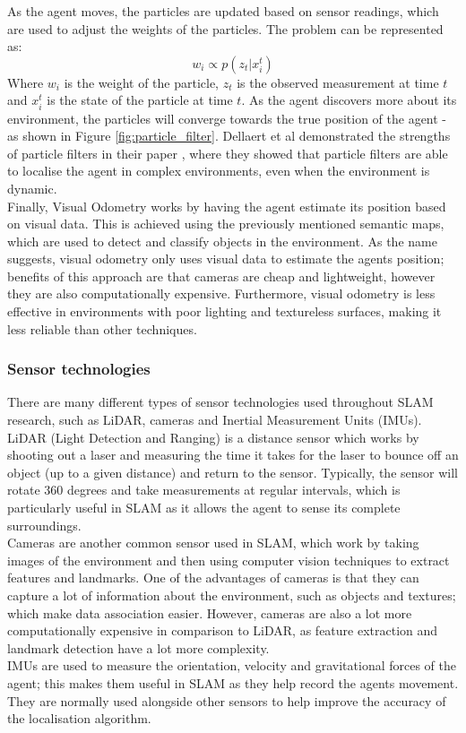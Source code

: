 \documentclass[12pt]{article}
\begin{document}
As the agent moves, the particles are updated based on sensor readings, which are used to adjust the weights of the particles. The problem can be represented as:
\begin{equation}
    w_i \propto p(z_t | x_i^t)
\end{equation}
Where \(w_i\) is the weight of the particle, \(z_t\) is the observed measurement at time \(t\) and \(x_i^t\) is the state of the particle at time \(t\). As the agent discovers more about its
environment, the particles will converge towards the true position of the agent - as shown in Figure \ref{fig:particle_filter}. Dellaert et al demonstrated the strengths of particle filters in their paper
\cite{monte_carlo_slam}, where they showed that particle filters are able to localise the agent in complex environments, even when the environment is dynamic.\\

Finally, Visual Odometry works by having the agent estimate its position based on visual data. This is achieved using the previously mentioned semantic maps, which are used to detect and classify
objects in the environment. As the name suggests, visual odometry only uses visual data to estimate the agents position; benefits of this approach are that cameras are cheap and lightweight, however
they are also computationally expensive. Furthermore, visual odometry is less effective in environments with poor lighting and textureless surfaces, making it less reliable than other techniques. \\

\subsubsection{Sensor technologies}
There are many different types of sensor technologies used throughout SLAM research, such as LiDAR, cameras and Inertial Measurement
Units (IMUs). LiDAR (Light Detection and Ranging) is a distance sensor which works by shooting out a laser and measuring the time it takes
for the laser to bounce off an object (up to a given distance) and return to the sensor. Typically, the sensor will rotate 360 degrees and take
measurements at regular intervals, which is particularly useful in SLAM as it allows the agent to sense its complete surroundings.\\
Cameras are another common sensor used in SLAM, which work by taking images of the environment and then using computer vision techniques
to extract features and landmarks. One of the advantages of cameras is that they can capture a lot of information about the environment, such
as objects and textures; which make data association easier. However, cameras are also a lot more computationally expensive in comparison to
LiDAR, as feature extraction and landmark detection have a lot more complexity.\\
IMUs are used to measure the orientation, velocity and gravitational forces of the agent; this makes them useful in SLAM as they help record
the agents movement. They are normally used alongside other sensors to help improve the accuracy of the localisation algorithm. \\
\end{document}
